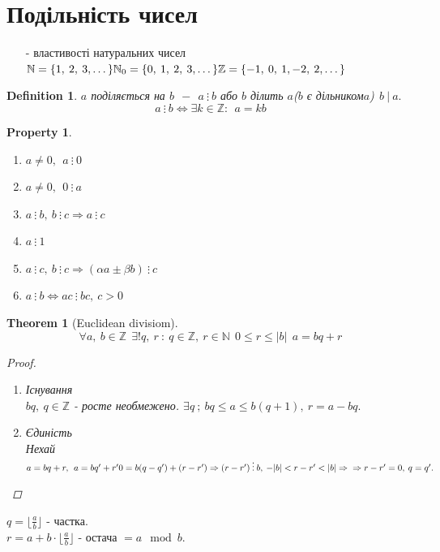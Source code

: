 \documentclass[a4paper,12pt, centered]{bookest}
\newtheorem{theorem}{Theorem}[section]
\newtheorem{definition}{Definition}[section]
\newtheorem*{property*}{Property}
\begin{document}
\section{Подільність чисел}
	\begin{enumerate}
		\item[-]властивості натуральних чисел\\
		$\mathbb{N}=\{1,\>2,\>3,\dots\}\\
		\mathbb{N}_0=\{0,\>1,\>2,\>3,\dots\}\\
		\mathbb{Z}=\{-1,\>0,\>1,-2,\>2,\dots\}$
	\end{enumerate}
	\begin{definition}
		$a$ поділяється на $b\>\>-\>\>a\>\vdots\>b$ або  $b$ ділить $a$($b$ є дільником$a$)$\>\>b\>|\>a.$
		$$a\>\vdots\>b\Leftrightarrow\exists k\in\mathbb{Z}:\>\>a=kb$$
	\end{definition}
	\begin{property*}$ $
	\begin{enumerate}
		\item $a\neq 0,\>\>a\>\vdots\>0$
		\item $a\neq 0,\>\>0\>\vdots\>a$
		\item $a\>\vdots\>b,\>b\>\vdots\>c\Rightarrow a\>\vdots\>c$
		\item $a\>\vdots\>1$
		\item $a\>\vdots\>c,\>b\>\vdots\>c\Rightarrow (\alpha a\pm\beta b)\>\vdots\>c$
		\item $a\>\vdots\>b\Leftrightarrow ac\>\vdots\>bc,\>c>0$
	\end{enumerate}		
	\end{property*}
	\begin{theorem}[Euclidean divisiom] 
	$$\forall a,\>b\in\mathbb{Z}\>\>\exists!q,\>r\>:\>q\in\mathbb{Z},\>r\in\mathbb{N}\>\>0\leq r\leq |b|\>\>a=bq+r$$
	\newpage
	\begin{proof}$ $
		\begin{enumerate}
			\item Існування\\
			$bq,\>q\in\mathbb{Z}$ - росте необмежено. $\exists q\>;\>bq\leq a\leq b(q+1),\>r=a-bq.$
			\item Єдиність\\
			Нехай $a=bq+r,\>\>a=bq'+r'\\
			0=b(q-q')+(r-r')\Rightarrow(r-r')\>\vdots\>b,\>-|b|<r-r'<|b|\Rightarrow\\\Rightarrow r-r'=0,\>q=q'.$
		\end{enumerate}
	\end{proof}
	\end{theorem}
	$q=\lfloor\frac{a}{b}\rfloor$ - частка.\\
	$r=a+b\cdot\lfloor\frac{a}{b}\rfloor$ - остача $=a\mod b$.
\end{document}
